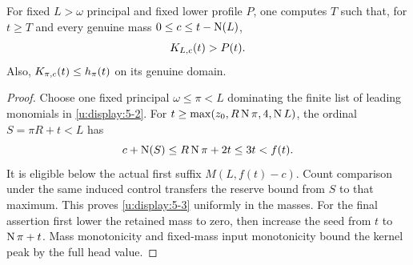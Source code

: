 \begin{lemma}\label{u:lem:direct}
For fixed $L>\omega$ principal and fixed lower profile $P$, one computes
$T$ such that, for $t\ge T$ and every genuine mass $0\le c\le t-\operatorname{N}(L)$,
\begin{equation}
                         K_{L,c}(t)>P(t).             \label{u:display:5-3}
\end{equation}
Also, $K_{\pi,c}(t)\le h_\pi(t)$ on its genuine domain.
\end{lemma}
\begin{proof}
Choose one fixed principal $\omega\le\pi<L$ dominating the finite list of
leading monomials in \eqref{u:display:5-2}. For
$t\ge\max(z_0,R\operatorname{N}\pi,4,\operatorname{N} L)$, the ordinal $S=\pi R+t<L$ has
\[
             c+\operatorname{N}(S)\le R\operatorname{N}\pi+2t\le3t<f(t).
\]
It is eligible below the actual first suffix $M(L,f(t)-c)$. Count
comparison under the same induced control transfers the reserve bound
from $S$ to that maximum. This proves \eqref{u:display:5-3} uniformly in the masses.
For the final assertion first lower the retained mass to zero, then
increase the seed from $t$ to $\operatorname{N}\pi+t$. Mass monotonicity and
fixed-mass input monotonicity bound the kernel peak by the full head value.
\end{proof}

